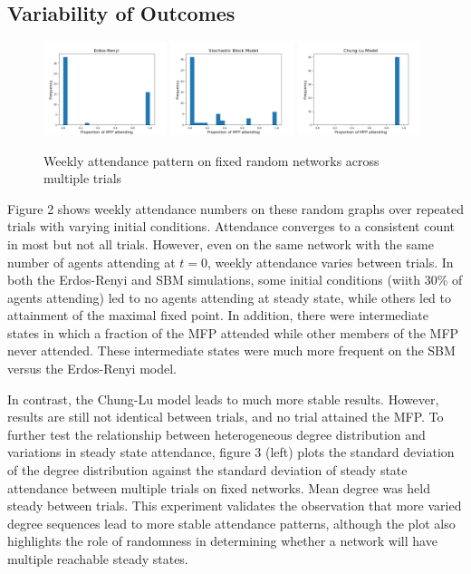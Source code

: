 \documentclass[12pt]{article}
\begin{document}
\subsection{Variability of Outcomes}
\begin{figure}[h!]
  \includegraphics[width=0.32\textwidth]{gnp_attendance.png}
  \includegraphics[width=0.32\textwidth]{sbm_attendance.png}
  \includegraphics[width=0.32\textwidth]{cm_attendance.png}
  \caption{Weekly attendance pattern on fixed random networks across multiple trials}
\end{figure}

Figure 2 shows weekly attendance numbers on these random graphs over repeated trials with varying initial conditions.  Attendance converges to a consistent count in most but not all trials.  However, even on the same network with the same number of agents attending at $t=0$, weekly attendance varies between trials.  In both the Erdos-Renyi and SBM simulations, some initial conditions (wiith 30\% of agents attending) led to no agents attending at steady state, while others led to attainment of the maximal fixed point.  In addition, there were intermediate states in which a fraction of the MFP attended while other members of the MFP never attended.  These intermediate states were much more frequent on the SBM versus the Erdos-Renyi model. 

In contrast, the Chung-Lu model leads to much more stable results.  However, results are still not identical between trials, and no trial attained the MFP.  To further test the relationship between heterogeneous degree distribution and variations in steady state attendance, figure 3 (left) plots the standard deviation of the degree distribution against the standard deviation of steady state attendance between multiple trials on fixed networks.  Mean degree was held steady between trials.  This experiment validates the observation that more varied degree sequences lead to more stable attendance patterns, although the plot also highlights the role of randomness in determining whether a network will have multiple reachable steady states.
\end{document}
